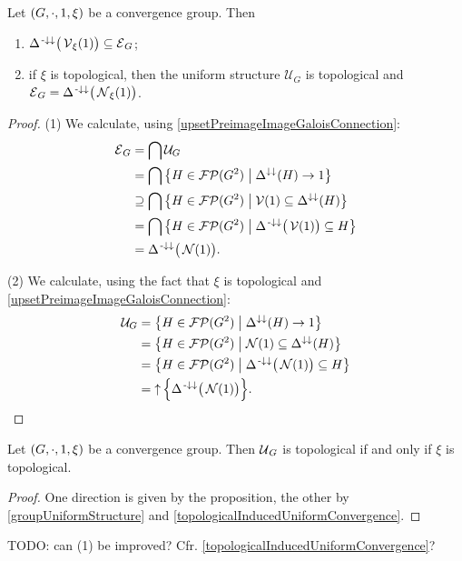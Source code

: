 \begin{proposition} \label{entourageConvergenceGroup}
Let $\left( G,\cdot, 1, \xi \right)$ be a convergence group. Then
\begin{enumerate}
\item $\Delta^{{\text{\hspace{0.15em}-}\downarrow}\downarrow}\big(\operatorname{\mathcal{V}}_\xi(1)\big) \subseteq \operatorname{\mathcal{E}}_{G}$;
\item if $\xi$ is topological, then the uniform structure $\mathcal{U}_G$ is topological and $\operatorname{\mathcal{E}}_{G} = \Delta^{{\text{\hspace{0.15em}-}\downarrow}\downarrow}\big(\operatorname{\mathcal{N}}_\xi(1)\big)$.
\end{enumerate}
\end{proposition}
\begin{proof}
(1) We calculate, using \ref{upsetPreimageImageGaloisConnection}:
\begin{align*}
\entourage_G &= \bigcap \mathcal{U}_G \\
&= \bigcap \setbuilder{H\in \powerfilters(G^2)}{\Delta^{\imf\imf}(H) \to 1} \\
&\supseteq \bigcap \setbuilder{H\in \powerfilters(G^2)}{\vicinity(1) \subseteq \Delta^{\imf\imf}(H)} \\
&= \bigcap \setbuilder{H\in \powerfilters(G^2)}{\Delta^{\preimf\imf}\big(\vicinity(1)\big) \subseteq H} \\
&= \Delta^{\preimf\imf}\big(\neighbourhood(1)\big).
\end{align*}

(2) We calculate, using the fact that $\xi$ is topological and \ref{upsetPreimageImageGaloisConnection}:
\begin{align*}
\mathcal{U}_G &= \setbuilder{H\in \powerfilters(G^2)}{\Delta^{\imf\imf}(H) \to 1} \\
&= \setbuilder{H\in \powerfilters(G^2)}{\neighbourhood(1) \subseteq \Delta^{\imf\imf}(H)} \\
&= \setbuilder{H\in \powerfilters(G^2)}{\Delta^{\preimf\imf}\big(\neighbourhood(1)\big) \subseteq H} \\
&= \upset\Big\{\Delta^{\preimf\imf}\big(\neighbourhood(1)\big)\Big\}.
\end{align*}
\end{proof}
\begin{corollary}
Let $\left( G, \cdot, 1, \xi \right)$ be a convergence group. Then $\operatorname{\mathcal{U}}_G$ is topological \textup{if and only if} $\xi$ is topological.
\end{corollary}
\begin{proof}
One direction is given by the proposition, the other by \ref{groupUniformStructure} and \ref{topologicalInducedUniformConvergence}.
\end{proof}
TODO: can (1) be improved? Cfr. \ref{topologicalInducedUniformConvergence}?

